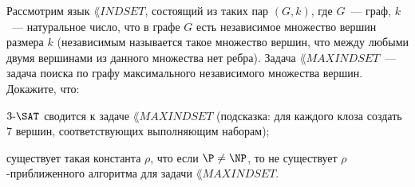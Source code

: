 Рассмотрим язык $\lang{INDSET}$, состоящий из таких пар $(G, k)$, где $G$~--- граф, $k$~--- натуральное число, что в графе
$G$ есть независимое множество вершин размера $k$ (независимым называется такое множество вершин, что между любыми двумя
вершинами из данного множества нет ребра). Задача $\lang{MAXINDSET}$~--- задача поиска по графу максимального независимого
множества вершин. Докажите, что:
\begin{enumcyr}
    \item $3\text{-}\SAT$ сводится к задаче $\lang{MAXINDSET}$ (подсказка: для каждого клоза создать $7$ вершин,
	    соответствующих выполняющим наборам);
    \item существует такая константа $\rho$, что если $\P \neq \NP$, то не существует $\rho$-приближенного алгоритма для
    	задачи $\lang{MAXINDSET}$.
\end{enumcyr}
